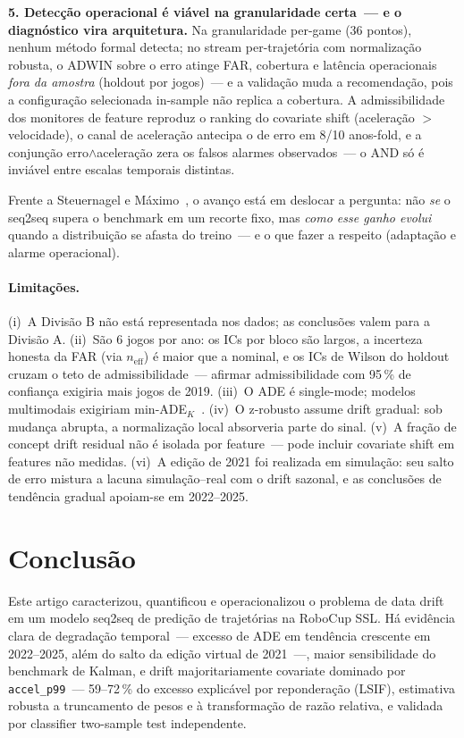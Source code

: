 \documentclass[runningheads]{llncs}
\begin{document}
\textbf{5. Detec\c{c}\~ao operacional \'e vi\'avel na granularidade certa~--- e o diagn\'ostico vira arquitetura.} Na granularidade per-game (36 pontos), nenhum m\'etodo formal detecta; no stream per-trajet\'oria com normaliza\c{c}\~ao robusta, o ADWIN sobre o erro atinge FAR, cobertura e lat\^encia operacionais \emph{fora da amostra} (holdout por jogos)~--- e a valida\c{c}\~ao muda a recomenda\c{c}\~ao, pois a configura\c{c}\~ao selecionada in-sample n\~ao replica a cobertura. A admissibilidade dos monitores de feature reproduz o ranking do covariate shift (acelera\c{c}\~ao $>$ velocidade), o canal de acelera\c{c}\~ao antecipa o de erro em 8/10 anos-fold, e a conjun\c{c}\~ao erro$\wedge$acelera\c{c}\~ao zera os falsos alarmes observados~--- o AND s\'o \'e invi\'avel entre escalas temporais distintas.

Frente a Steuernagel e M\'aximo~\cite{seq2seq}, o avan\c{c}o est\'a em deslocar a pergunta: n\~ao \emph{se} o seq2seq supera o benchmark em um recorte fixo, mas \emph{como esse ganho evolui} quando a distribui\c{c}\~ao se afasta do treino~--- e o que fazer a respeito (adapta\c{c}\~ao e alarme operacional).

\paragraph{Limita\c{c}\~oes.}
(i)~A Divis\~ao B n\~ao est\'a representada nos dados; as conclus\~oes valem para a Divis\~ao A. (ii)~S\~ao 6 jogos por ano: os ICs por bloco s\~ao largos, a incerteza honesta da FAR (via $n_\text{eff}$) \'e maior que a nominal, e os ICs de Wilson do holdout cruzam o teto de admissibilidade~--- afirmar admissibilidade com 95\,\% de confian\c{c}a exigiria mais jogos de 2019. (iii)~O ADE \'e single-mode; modelos multimodais exigiriam min-ADE$_K$~\cite{salzmann2020,yuan2021}. (iv)~O z-robusto assume drift gradual: sob mudan\c{c}a abrupta, a normaliza\c{c}\~ao local absorveria parte do sinal. (v)~A fra\c{c}\~ao de concept drift residual n\~ao \'e isolada por feature~--- pode incluir covariate shift em features n\~ao medidas. (vi)~A edi\c{c}\~ao de 2021 foi realizada em simula\c{c}\~ao: seu salto de erro mistura a lacuna simula\c{c}\~ao--real com o drift sazonal, e as conclus\~oes de tend\^encia gradual apoiam-se em 2022--2025.

\section{Conclus\~ao}

Este artigo caracterizou, quantificou e operacionalizou o problema de data drift em um modelo seq2seq de predi\c{c}\~ao de trajet\'orias na RoboCup SSL. H\'a evid\^encia clara de degrada\c{c}\~ao temporal~--- excesso de ADE em tend\^encia crescente em 2022--2025, al\'em do salto da edi\c{c}\~ao virtual de 2021~---, maior sensibilidade do benchmark de Kalman, e drift majoritariamente covariate dominado por \texttt{accel\_p99}~--- 59--72\,\% do excesso explic\'avel por repondera\c{c}\~ao (LSIF), estimativa robusta a truncamento de pesos e \`a transforma\c{c}\~ao de raz\~ao relativa, e validada por classifier two-sample test independente.
\end{document}
